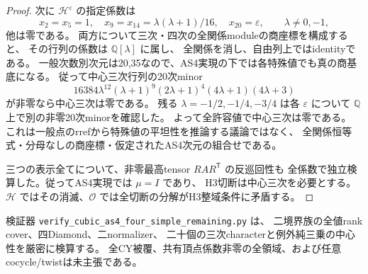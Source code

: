 \begin{proof}
次に $\mathcal H^\varepsilon$ の指定係数は
\[
 x_2=x_5=1,\quad x_9=x_{14}=\lambda(\lambda+1)/16,\quad
 x_{20}=\varepsilon,
 \qquad\lambda\ne0,-1,
\]
他は零である。
両方について三次・四次の全関係moduleの商座標を構成すると、
その行列の係数は $\mathbb Q[\lambda]$ に属し、
全関係を消し、自由列上ではidentityである。
一般次数別次元は20,35なので、AS4実現の下では各特殊値でも真の商基底になる。
従って中心三次行列の20次minor
\[
 16384\lambda^{12}(\lambda+1)^9(2\lambda+1)^4(4\lambda+1)(4\lambda+3)
\]
が非零なら中心三次は零である。
残る $\lambda=-1/2,-1/4,-3/4$ は各 $\varepsilon$ について
$\mathbb Q$ 上で別の非零20次minorを確認した。
よって全許容値で中心三次は零である。
これは一般点のrrefから特殊値の平坦性を推論する議論ではなく、
全関係恒等式・分母なしの商座標・仮定されたAS4次元の組合せである。

三つの表示全てについて、非零最高tensor $R A R^{\mathsf T}$ の反巡回性も
全係数で独立検算した。従ってAS4実現では $\mu=I$ であり、
H3切断は中心三次を必要とする。
$\mathcal H$ ではその消滅、$\mathcal O$ では全切断の分解がH3整域条件に矛盾する。
\end{proof}

検証器 \texttt{verify\_cubic\_as4\_four\_simple\_remaining.py} は、
二境界族の全値rank cover、四Diamond、二normalizer、
二十個の三次characterと例外純三乗の中心性を厳密に検算する。
全CY被覆、共有頂点係数非零の全領域、および任意cocycle/twistは未主張である。

